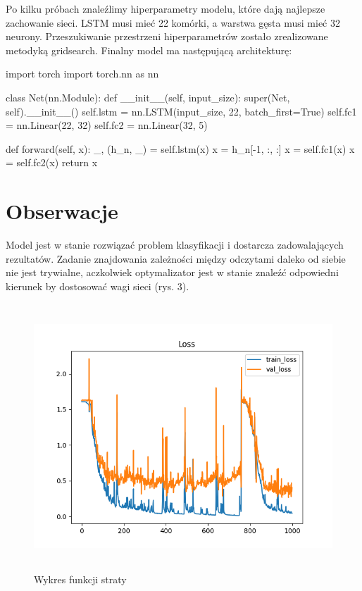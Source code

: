 \documentclass[10pt]{article}
\begin{document}
Po kilku próbach znaleźlimy hiperparametry modelu, które dają najlepsze zachowanie sieci. LSTM musi mieć 22 komórki, a warstwa gęsta musi mieć 32 neurony. Przeszukiwanie przestrzeni hiperparametrów zostało zrealizowane metodyką gridsearch. Finalny model ma następującą architekturę:

\begin{python}
import torch
import torch.nn as nn

class Net(nn.Module):
  def __init__(self, input_size):
      super(Net, self).__init__()
      self.lstm = nn.LSTM(input_size, 22, batch_first=True)
      self.fc1 = nn.Linear(22, 32)
      self.fc2 = nn.Linear(32, 5)

  def forward(self, x):
      _, (h_n, _) = self.lstm(x)
      x = h_n[-1, :, :]
      x = self.fc1(x)
      x = self.fc2(x)
      return x
\end{python}


\section{Obserwacje}

Model jest w stanie rozwiązać problem klasyfikacji i dostarcza zadowalających rezultatów. Zadanie znajdowania zależności między odczytami daleko od siebie nie jest trywialne, aczkolwiek optymalizator jest w stanie znaleźć odpowiedni kierunek by dostosować wagi sieci (rys. 3).


\begin{figure}[H]
  \includegraphics[height=10cm]{loss.png}
  \centering
  \caption{Wykres funkcji straty}
\end{figure}
\end{document}
